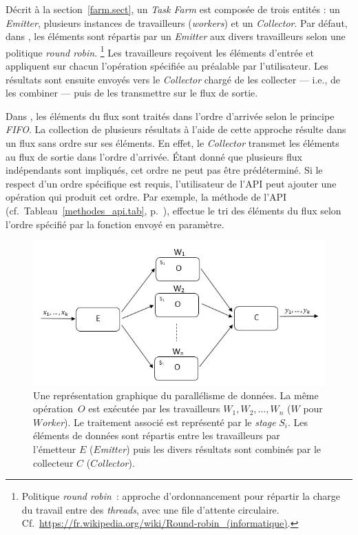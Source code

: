 D\'ecrit \`a la section~\ref{farm.sect}, un \emph{Task Farm} est compos\'ee de trois entit\'es : un \emph{Emitter}, plusieurs instances de travailleurs (\emph{workers}) et un \emph{Collector}. Par d\'efaut, dans \PpFf{}, les \'el\'ements sont r\'epartis par un \emph{Emitter} aux divers travailleurs selon une politique \emph{round robin}.%
%
\footnote{Politique \emph{round robin}~: approche d'ordonnancement pour r\'epartir la charge du travail entre des \emph{threads}, avec une file d'attente circulaire. Cf.~\url{https://fr.wikipedia.org/wiki/Round-robin_(informatique)}.} 
%
Les travailleurs re\c{c}oivent les \'el\'ements d'entr\'ee et appliquent sur chacun l'op\'eration sp\'ecifi\'ee au pr\'ealable par l'utilisateur. Les r\'esultats sont ensuite envoy\'es vers le \emph{Collector} charg\'e de les collecter --- i.e., de les combiner --- puis de les transmettre sur le flux de sortie.

Dans , les \'el\'ements du flux sont trait\'es dans l'ordre d'arriv\'ee selon le principe \emph{FIFO}. La collection de plusieurs r\'esultats \`a l'aide de cette approche r\'esulte dans un flux sans ordre sur ses \'el\'ements. En effet, le \emph{Collector} transmet les \'el\'ements au flux de sortie dans l'ordre d'arriv\'ee. \'Etant donn\'e que plusieurs flux ind\'ependants sont impliqu\'es, cet ordre ne peut pas \^etre pr\'ed\'etermin\'e. Si le respect d'un  ordre sp\'ecifique est requis, l'utilisateur de l'API peut ajouter une op\'eration qui produit cet ordre. Par exemple, la m\'ethode  de l'API (cf.~Tableau~\ref{methodes_api.tab}, p.~\pageref{sort.page}), effectue le tri des \'el\'ements du flux selon l'ordre sp\'ecifi\'e par la fonction  envoy\'e en param\`etre.

\begin{figure}
\centering
     \includegraphics[width=1.0\textwidth]{Figures/DataParallelisme.jpg}
      \caption[Une repr\'esentation graphique du parall\'elisme de donn\'ees en \ppff.]{Une repr\'esentation graphique du parall\'elisme de donn\'ees. La m\^eme op\'eration~$O$ est ex\'ecut\'ee par les travailleurs $W_1, W_2,\ldots, W_n$ ($W$ pour \emph{$W$orker}). Le traitement associ\'e est repr\'esent\'e par le \emph{stage} $S_i$. Les \'el\'ements de donn\'ees sont r\'epartis entre les travailleurs par l'\'emetteur $E$ ($E$\emph{mitter}) puis les divers r\'esultats sont combin\'es par le collecteur $C$ ($C$\emph{ollector}).}
       \label{DataParallelisme.fig}
\end{figure}

